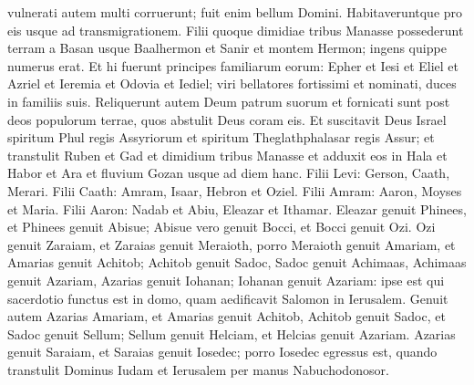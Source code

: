 \begin{biblechapter}
\begin{biblechapter}
\begin{biblechapter}
\begin{biblechapter}
\begin{biblechapter}
\verse vulnerati autem multi corruerunt; fuit enim bellum Domini. Habitaveruntque pro eis usque ad transmigrationem.
 \verse Filii quoque dimidiae tribus Manasse possederunt terram a Basan usque Baalhermon et Sanir et montem Hermon; ingens quippe numerus erat. 
\verse Et hi fuerunt principes familiarum eorum: Epher et Iesi et Eliel et Azriel et Ieremia et Odovia et Iediel; viri bellatores fortissimi et nominati, duces in familiis suis.
 \verse Reliquerunt autem Deum patrum suorum et fornicati sunt post deos populorum terrae, quos abstulit Deus coram eis. 
\verse Et suscitavit Deus Israel spiritum Phul regis Assyriorum et spiritum Theglathphalasar regis Assur; et transtulit Ruben et Gad et dimidium tribus Manasse et adduxit eos in Hala et Habor et Ara et fluvium Gozan usque ad diem hanc.
 \verse Filii Levi: Gerson, Caath, Merari. 
\verse Filii Caath: Amram, Isaar, Hebron et Oziel. 
\verse Filii Amram: Aaron, Moyses et Maria. Filii Aaron: Nadab et Abiu, Eleazar et Ithamar. 
\verse Eleazar genuit Phinees, et Phinees genuit Abisue; 
\verse Abisue vero genuit Bocci, et Bocci genuit Ozi. 
\verse Ozi genuit Zaraiam, et Zaraias genuit Meraioth, 
\verse porro Meraioth genuit Amariam, et Amarias genuit Achitob; 
\verse Achitob genuit Sadoc, Sadoc genuit Achimaas, 
 \verse Achimaas genuit Azariam, Azarias genuit Iohanan; 
\verse Iohanan genuit Azariam: ipse est qui sacerdotio functus est in domo, quam aedificavit Salomon in Ierusalem. 
\verse Genuit autem Azarias Amariam, et Amarias genuit Achitob, 
 \verse Achitob genuit Sadoc, et Sadoc genuit Sellum; 
\verse Sellum genuit Helciam, et Helcias genuit Azariam. 
\verse Azarias genuit Saraiam, et Saraias genuit Iosedec; 
\verse porro Iosedec egressus est, quando transtulit Dominus Iudam et Ierusalem per manus Nabuchodonosor.
 

\end{biblechapter}
\end{biblechapter}
\end{biblechapter}
\end{biblechapter}
\end{biblechapter}
